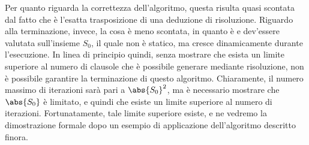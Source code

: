 Per quanto riguarda la correttezza dell'algoritmo, questa risulta quasi scontata dal fatto che è l'esatta trasposizione di una deduzione di risoluzione. 
Riguardo alla terminazione, invece, la cosa è meno scontata, in quanto è e dev'essere valutata sull'insieme \(S_0\), il quale non è statico, ma cresce dinamicamente durante l'esecuzione. In linea di principio quindi, senza mostrare che esista un limite superiore al numero di clausole che è possibile generare mediante risoluzione, non è possibile garantire la terminazione di questo algoritmo. Chiaramente, il numero massimo di iterazioni sarà pari a \(\abs{S_0}^2\), ma è necessario mostrare che \(\abs{S_0}\) è limitato, e quindi che esiste un limite superiore al numero di iterazioni.
Fortunatamente, tale limite superiore esiste, e ne vedremo la dimostrazione formale dopo un esempio di applicazione dell'algoritmo descritto finora.

